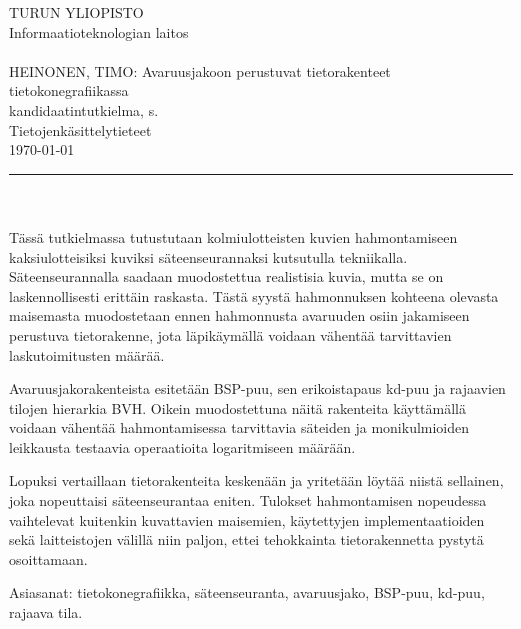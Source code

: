 ﻿\setlength{\hoffset}{-1in} \setlength{\oddsidemargin}{4cm} \addtolength{\textwidth}{1.3cm} \addtolength{\textheight}{1cm} \setlength{\voffset}{-1in}
\thispagestyle{empty}  %

\noindent
TURUN YLIOPISTO\\
Informaatioteknologian laitos\\
\\
HEINONEN, TIMO: Avaruusjakoon perustuvat tietorakenteet tietokonegrafiikassa\\
kandidaatintutkielma, \pageref{LastPage} s.\\
Tietojenkäsittelytieteet\\
\today\\
\rule{\textwidth}{.2mm}\\
\\
Tässä tutkielmassa tutustutaan kolmiulotteisten kuvien hahmontamiseen kaksiulotteisiksi kuviksi säteenseurannaksi kutsutulla tekniikalla. Säteenseurannalla saadaan muodostettua realistisia kuvia, mutta se on laskennollisesti erittäin raskasta. Tästä syystä hahmonnuksen kohteena olevasta maisemasta muodostetaan ennen hahmonnusta avaruuden osiin jakamiseen perustuva tietorakenne, jota läpikäymällä voidaan vähentää tarvittavien laskutoimitusten määrää.

\vspace{4mm}

Avaruusjakorakenteista esitetään BSP-puu, sen erikoistapaus kd-puu ja rajaavien tilojen hierarkia BVH. Oikein muodostettuna näitä rakenteita käyttämällä voidaan vähentää hahmontamisessa tarvittavia säteiden ja monikulmioiden leikkausta testaavia operaatioita logaritmiseen määrään. 

\vspace{4mm}

Lopuksi vertaillaan tietorakenteita keskenään ja yritetään löytää niistä sellainen, joka nopeuttaisi säteenseurantaa eniten. Tulokset hahmontamisen nopeudessa vaihtelevat kuitenkin kuvattavien maisemien, käytettyjen implementaatioiden sekä laitteistojen välillä niin paljon, ettei tehokkainta tietorakennetta pystytä osoittamaan.


\vfill
\vspace{4mm}Asiasanat: tietokonegrafiikka, säteenseuranta, avaruusjako, BSP-puu, kd-puu, rajaava tila.

